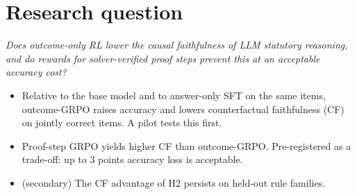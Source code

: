 \documentclass[10pt,a4paper]{article}
\newcommand{\hyp}[1]{\textbf{\color{tum}#1}}
\begin{document}
\section{Research question}
\emph{Does outcome-only RL lower the causal faithfulness of LLM statutory reasoning, and do rewards for solver-verified proof steps prevent this at an acceptable accuracy cost?}
\begin{itemize}
  \item[\hyp{H1}] Relative to the base model and to answer-only SFT on the same items, outcome-GRPO raises accuracy and lowers counterfactual faithfulness (CF) on jointly correct items. A pilot tests this first.
  \item[\hyp{H2}] Proof-step GRPO yields higher CF than outcome-GRPO. Pre-registered as a trade-off: up to 3 points accuracy loss is acceptable.
  \item[\hyp{H3}] (secondary) The CF advantage of H2 persists on held-out rule families.
\end{itemize}
\end{document}
